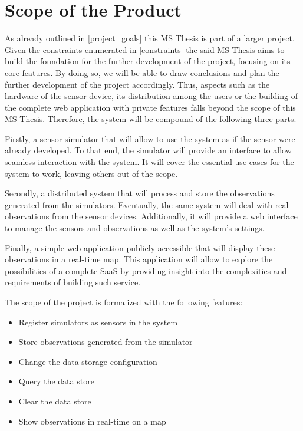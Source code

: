 \section{Scope of the Product}

As already outlined in \ref{project_goals} this MS Thesis is part of a larger project. Given the constraints enumerated in \ref{constraints} the said MS Thesis aims to build the foundation for the further development of the project, focusing on its core features. By doing so, we will be able to draw conclusions and plan the further development of the project accordingly. Thus, aspects such as the hardware of the sensor device, its distribution among the users or the building of the complete web application with private features falls beyond the scope of this MS Thesis. Therefore, the system will be compound of the following three parts. 

Firstly, a sensor simulator that will allow to use the system as if the sensor were already developed. To that end, the simulator will provide an interface to allow seamless interaction with the system. It will cover the essential use cases for the system to work, leaving others out of the scope.

Secondly, a distributed system that will process and store the observations generated from the simulators. Eventually, the same system will deal with real observations from the sensor devices. Additionally, it will provide a web interface to manage the sensors and observations as well as the system's settings.

Finally, a simple web application publicly accessible that will display these observations in a real-time map. This application will allow to explore the possibilities of a complete SaaS by providing insight into the complexities and requirements of building such service.

The scope of the project is formalized with the following features:

\begin{itemize}
\item Register simulators as sensors in the system
\item Store observations generated from the simulator
\item Change the data storage configuration
\item Query the data store
\item Clear the data store
\item Show observations in real-time on a map
\end{itemize}

